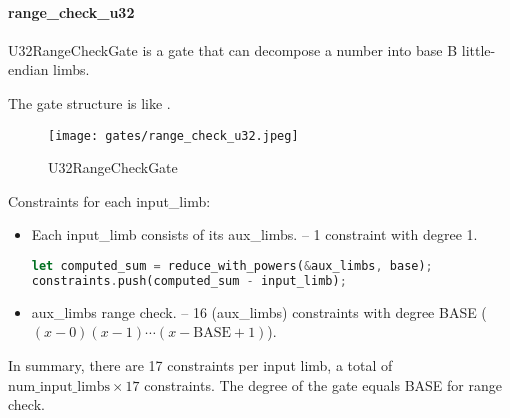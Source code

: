 \paragraph{range\_check\_u32}

\hspace*{\fill}

\indent U32RangeCheckGate is a gate that can decompose a number into base B little-endian limbs.

The gate structure is like .

\begin{figure}[!ht]
    \centering
    \texttt{[image: gates/range\_check\_u32.jpeg]}
    \caption{U32RangeCheckGate}
    \label{fig:range-check-u32}
\end{figure}

Constraints for each input\_limb:
\begin{itemize}
    \item Each input\_limb consists of its aux\_limbs. -- 1 constraint with degree 1.
    \begin{lstlisting}[language=rust]
let computed_sum = reduce_with_powers(&aux_limbs, base);
constraints.push(computed_sum - input_limb);
    \end{lstlisting}
    \item aux\_limbs range check. -- 16 (aux\_limbs) constraints with degree BASE ($(x-0)(x-1)\cdots(x-\text{BASE}+1)$).
\end{itemize}

In summary, there are 17 constraints per input limb, a total of $\text{num\_input\_limbs} \times 17$ constraints. 
The degree of the gate equals BASE for range check.
